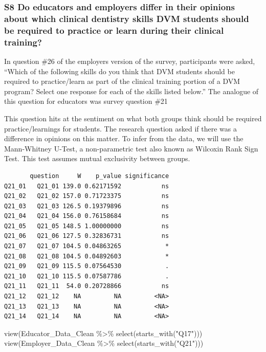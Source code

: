 \documentclass[
  11pt,
  letterpaper,
  DIV=11,
  numbers=noendperiod]{scrartcl}
\newenvironment{Shaded}{\begin{snugshade}}{\end{snugshade}}
\newcommand{\FunctionTok}[1]{\textcolor[rgb]{0.28,0.35,0.67}{#1}}
\newcommand{\NormalTok}[1]{\textcolor[rgb]{0.00,0.23,0.31}{#1}}
\newcommand{\SpecialCharTok}[1]{\textcolor[rgb]{0.37,0.37,0.37}{#1}}
\newcommand{\StringTok}[1]{\textcolor[rgb]{0.13,0.47,0.30}{#1}}
\begin{document}
\hypertarget{s8-do-educators-and-employers-differ-in-their-opinions-about-which-clinical-dentistry-skills-dvm-students-should-be-required-to-practice-or-learn-during-their-clinical-training}{%
\subsubsection{S8 Do educators and employers differ in their opinions
about which clinical dentistry skills DVM students should be required to
practice or learn during their clinical
training?}\label{s8-do-educators-and-employers-differ-in-their-opinions-about-which-clinical-dentistry-skills-dvm-students-should-be-required-to-practice-or-learn-during-their-clinical-training}}

In question \#26 of the employers version of the survey, participants
were asked, ``Which of the following skills do you think that DVM
students should be required to practice/learn as part of the clinical
training portion of a DVM program? Select one response for each of the
skills listed below.'' The analogue of this question for educators was
survey question \#21

This question hits at the sentiment on what both groups think should be
required practice/learnings for students. The research question asked if
there was a difference in opinions on this matter. To infer from the
data, we will use the Mann-Whitney U-Test, a non-parametric test also
known as Wilcoxin Rank Sign Test. This test assumes mutual exclusivity
between groups.

\begin{verbatim}
       question     W    p_value significance
Q21_01   Q21_01 139.0 0.62171592           ns
Q21_02   Q21_02 157.0 0.71723375           ns
Q21_03   Q21_03 126.5 0.19379896           ns
Q21_04   Q21_04 156.0 0.76158684           ns
Q21_05   Q21_05 148.5 1.00000000           ns
Q21_06   Q21_06 127.5 0.32836731           ns
Q21_07   Q21_07 104.5 0.04863265            *
Q21_08   Q21_08 104.5 0.04892603            *
Q21_09   Q21_09 115.5 0.07564530            .
Q21_10   Q21_10 115.5 0.07587786            .
Q21_11   Q21_11  54.0 0.20728866           ns
Q21_12   Q21_12    NA         NA         <NA>
Q21_13   Q21_13    NA         NA         <NA>
Q21_14   Q21_14    NA         NA         <NA>
\end{verbatim}

\begin{Shaded}
\begin{Highlighting}[]
\FunctionTok{view}\NormalTok{(Educator\_Data\_Clean }\SpecialCharTok{\%\textgreater{}\%} \FunctionTok{select}\NormalTok{(}\FunctionTok{starts\_with}\NormalTok{(}\StringTok{"Q17"}\NormalTok{)))}
\FunctionTok{view}\NormalTok{(Employer\_Data\_Clean }\SpecialCharTok{\%\textgreater{}\%} \FunctionTok{select}\NormalTok{(}\FunctionTok{starts\_with}\NormalTok{(}\StringTok{"Q21"}\NormalTok{)))}
\end{Highlighting}
\end{Shaded}
\end{document}

